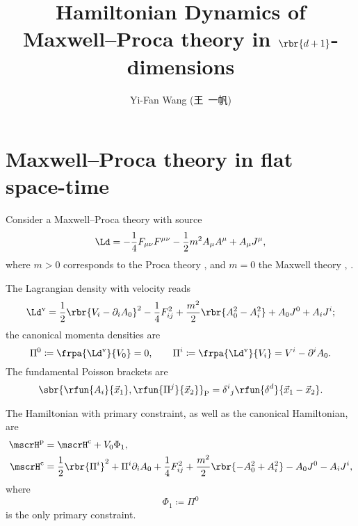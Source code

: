 \documentclass[a4paper,11pt]{article}
\title{Hamiltonian Dynamics of Maxwell--Proca theory in $\rbr{d+1}$-dimensions}
\author{Yi-Fan Wang (王\ 一帆)}
\begin{document}
\maketitle


\section{Maxwell--Proca theory in flat space-time}

Consider a Maxwell--Proca theory with source
\begin{equation}
\Ld = -\frac{1}{4} F_{\mu\nu} F^{\mu\nu} - \frac{1}{2} m^2 A_\mu A^\mu
+ A_\mu J^\mu,
\end{equation}
where $m > 0$ corresponds to the Proca theory \cite[sec.\ 2.3]{Gitman1990}, and 
$m = 0$ the Maxwell theory \cite[sec.\ 3.3.3]{Rothe2010}, \cite[sec.\ 
2.4]{Gitman1990}.

The Lagrangian density with velocity reads
\begin{equation}
\Ld^\text{v} = \frac{1}{2} \rbr{V_i - \partial_i A_0}^2 - \frac{1}{4} F_{ij}^2 
+ \frac{m^2}{2} \rbr{A_0^2 - A_i^2} + A_0 J^0 + A_i J^i;
\end{equation}
the canonical momenta densities are
\begin{equation}
\Pi^0 \coloneqq \frpa{\Ld^\text{v}}{V_0} = 0,\qquad
\Pi^i \coloneqq \frpa{\Ld^\text{v}}{V_i} = V^i - \partial^i A_0.
\end{equation}
The fundamental Poisson brackets are
\begin{equation}
\sbr{\rfun{A_i}{\vec x_1}, \rfun{\Pi^j}{\vec x_2}}_\text{P} =
\delta^i{}_j\rfun{\delta^d}{\vec x_1 - \vec x_2}.
\end{equation}

The Hamiltonian with primary constraint, as well as the canonical Hamiltonian, 
are
\begin{align}
\mscrH^\text{p} &= \mscrH^\text{c} + V_0 \Phi_1,\\
\mscrH^\text{c} &= \frac{1}{2} \rbr{\Pi^i}^2 + \Pi^i \partial_i A_0 + 
\frac{1}{4} 
F_{ij}^2 + \frac{m^2}{2} \rbr{-A_0^2 + A_i^2} - A_0 J^0 - A_i J^i,
\label{eq:canonical-Hamil-general-MP}\\
\end{align}
where
\begin{equation}
\Phi_1 \coloneqq \Pi^0
\end{equation}
is the only primary constraint.
\end{document}
